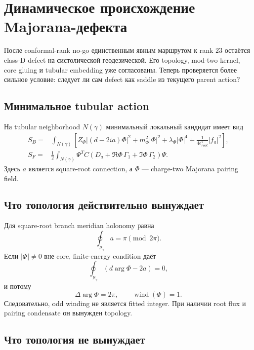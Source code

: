 \chapter{Динамическое происхождение Majorana-дефекта}

После conformal-rank no-go единственным явным маршрутом к rank \(23\)
остаётся class-D defect на систолической геодезической. Его topology,
mod-two kernel, core gluing и tubular embedding уже согласованы. Теперь
проверяется более сильное условие: следует ли сам defect как saddle из
текущего parent action?

\section{Минимальное tubular action}

На tubular neighborhood \(N(\gamma)\) минимальный локальный кандидат имеет
вид
\begin{align}
 S_B={}&\int_{N(\gamma)}
 \left[
 Z_\Phi |(d-2ia)\Phi|^2
 +m_\Phi^2|\Phi|^2+\lambda_\Phi|\Phi|^4
 +\frac1{4e_{root}^2}|f_a|^2
 \right],\\
 S_F={}&\frac12\int_{N(\gamma)}
 \Psi^T C\left(
 D_a+\Re\Phi\,\Gamma_1+\Im\Phi\,\Gamma_2
 \right)\Psi.
\end{align}
Здесь \(a\) является square-root connection, а \(\Phi\) --- charge-two
Majorana pairing field.

\section{Что топология действительно вынуждает}

Для square-root branch meridian holonomy равна
\begin{equation}
 \oint_{\mu_\gamma}a=\pi\pmod{2\pi}.
\end{equation}
Если \(|\Phi|\neq0\) вне core, finite-energy condition даёт
\begin{equation}
 \oint_{\mu_\gamma}(d\arg\Phi-2a)=0,
\end{equation}
и потому
\begin{equation}
 \Delta\arg\Phi=2\pi,
 \qquad
 \operatorname{wind}(\Phi)=1.
\end{equation}
Следовательно, odd winding не является fitted integer. При наличии root
flux и pairing condensate он вынужден topology.

\section{Что топология не вынуждает}

